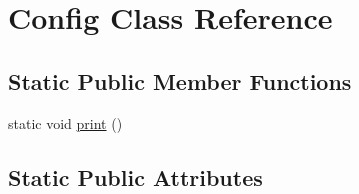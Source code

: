 \hypertarget{class_config}{}\section{Config Class Reference}
\label{class_config}
\subsection*{Static Public Member Functions}
\begin{DoxyCompactItemize}
\item 
static void \hyperlink{class_config_a145fb48e8056b0f8f5ce92d6184e73f9}{print} ()
\end{DoxyCompactItemize}
\subsection*{Static Public Attributes}
